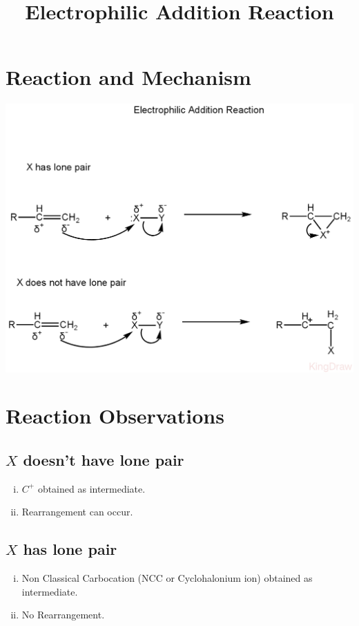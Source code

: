 \documentclass{article}
\title{Electrophilic Addition Reaction}
\author{}
\date{}
\begin{document}
\maketitle

\section{Reaction and Mechanism}
\begin{center}
    \includegraphics[scale=0.3]{ElectrophilicAdditionReaction_1722210371705.JPEG}
\end{center}
\section{Reaction Observations}
\subsection{$X$ doesn't have lone pair}
\begin{enumerate}[i.]
    \item $C^+$ obtained as intermediate.
    \item Rearrangement can occur.
\end{enumerate}
\subsection{$X$ has lone pair}
\begin{enumerate}[i.]
    \item Non Classical Carbocation (NCC or Cyclohalonium ion) obtained as intermediate.
    \item No Rearrangement.
\end{enumerate}
\end{document}
